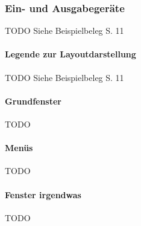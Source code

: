 \subsubsection{Ein- und Ausgabegeräte}
TODO Siehe Beispielbeleg S. 11

\paragraph{Legende zur Layoutdarstellung}
TODO Siehe Beispielbeleg S. 11

\paragraph{Grundfenster}
TODO

\paragraph{Menüs}
TODO

\paragraph{Fenster irgendwas}
TODO
